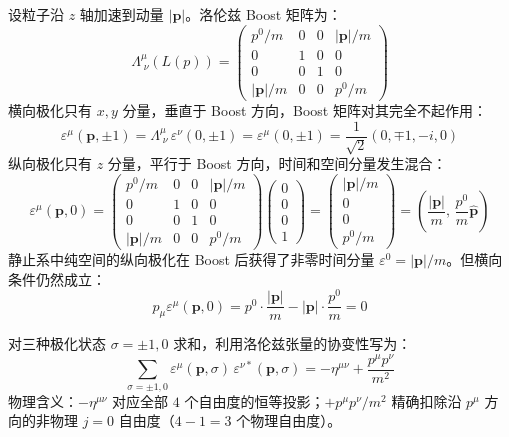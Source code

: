 \vspace{2ex}\par 设粒子沿 $z$ 轴加速到动量 $|\boldsymbol{p}|$。洛伦兹 Boost 矩阵为：
\begin{equation}
    \Lambda^\mu_{\;\nu}(L(p)) = \begin{pmatrix} p^0/m & 0 & 0 & |\boldsymbol{p}|/m \\ 0&1&0&0 \\ 0&0&1&0 \\ |\boldsymbol{p}|/m & 0 & 0 & p^0/m \end{pmatrix}
\end{equation}
横向极化只有 $x,y$ 分量，垂直于 Boost 方向，Boost 矩阵对其完全不起作用：
\begin{equation}
    \varepsilon^\mu(\boldsymbol{p},\pm 1) = \Lambda^\mu_{\;\nu}\,\varepsilon^\nu(0,\pm 1) = \varepsilon^\mu(0,\pm 1) = \frac{1}{\sqrt{2}}(0,\mp 1,-i,0)
\end{equation}
纵向极化只有 $z$ 分量，平行于 Boost 方向，时间和空间分量发生混合：
\begin{equation}
    \varepsilon^\mu(\boldsymbol{p},0) = \begin{pmatrix} p^0/m&0&0&|\boldsymbol{p}|/m\\0&1&0&0\\0&0&1&0\\|\boldsymbol{p}|/m&0&0&p^0/m \end{pmatrix}\begin{pmatrix}0\\0\\0\\1\end{pmatrix} = \begin{pmatrix}|\boldsymbol{p}|/m\\0\\0\\p^0/m\end{pmatrix} = \left(\frac{|\boldsymbol{p}|}{m},\,\frac{p^0}{m}\hat{\boldsymbol{p}}\right)
\end{equation}
静止系中纯空间的纵向极化在 Boost 后获得了非零时间分量 $\varepsilon^0=|\boldsymbol{p}|/m$。但横向条件仍然成立：
\begin{equation}
    p_\mu\varepsilon^\mu(\boldsymbol{p},0) = p^0\cdot\frac{|\boldsymbol{p}|}{m} - |\boldsymbol{p}|\cdot\frac{p^0}{m} = 0
\end{equation}
\vspace{2ex}\par
对三种极化状态 $\sigma=\pm 1,0$ 求和，利用洛伦兹张量的协变性写为：
\begin{equation}
    \boxed{\sum_{\sigma=\pm 1,0}\varepsilon^\mu(\boldsymbol{p},\sigma)\,\varepsilon^{\nu*}(\boldsymbol{p},\sigma) = -\eta^{\mu\nu}+\frac{p^\mu p^\nu}{m^2}}
    \label{eq:vec_pol}
\end{equation}
物理含义：$-\eta^{\mu\nu}$ 对应全部 $4$ 个自由度的恒等投影；$+p^\mu p^\nu/m^2$ 精确扣除沿 $p^\mu$ 方向的非物理 $j=0$ 自由度（$4-1=3$ 个物理自由度）。





   
